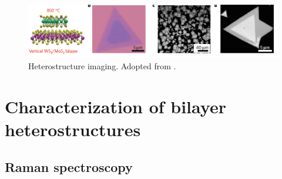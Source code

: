 \begin{figure}[h]
	\begin{center}
		\includegraphics[scale=1]{Heterostructures/HeterostructureOpticalSEMAFMImages.png}
		\caption{Heterostructure imaging. Adopted from \cite{Gong2014}.}
		\label{fig:HeterostructuresOpticalSEMAFMImages}
	\end{center}
\end{figure}

\section{Characterization of bilayer heterostructures}

\subsection{Raman spectroscopy}


